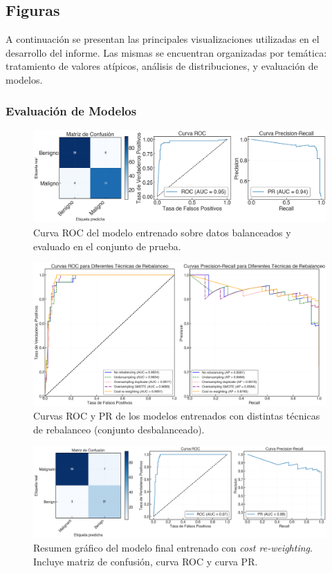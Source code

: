 \subsection{Figuras}

A continuación se presentan las principales visualizaciones utilizadas en el desarrollo del informe. Las mismas se encuentran organizadas por temática: tratamiento de valores atípicos, análisis de distribuciones, y evaluación de modelos.

\subsubsection*{Evaluación de Modelos}

\begin{figure}[H]
    \centering
    \includegraphics[width=0.8\linewidth]{figures/p1/roc_auc_balanced_test.png}
    \caption{Curva ROC del modelo entrenado sobre datos balanceados y evaluado en el conjunto de prueba.}
    \label{fig:roc_auc_balanced_test}
\end{figure}

\begin{figure}[H]
    \centering
    \includegraphics[width=0.8\linewidth]{figures/p1/roc_auc_imbalanced_test.png}
    \caption{Curvas ROC y PR de los modelos entrenados con distintas técnicas de rebalanceo (conjunto desbalanceado).}
    \label{fig:roc_auc_imbalanced_test}
\end{figure}

\begin{figure}[H]
    \centering
    \includegraphics[width=0.8\linewidth]{figures/p1/metric_plot_imbalanced_cw.png}
    \caption{Resumen gráfico del modelo final entrenado con \textit{cost re-weighting}. Incluye matriz de confusión, curva ROC y curva PR.}
    \label{fig:metric_plot_imbalanced_cw}
\end{figure}


